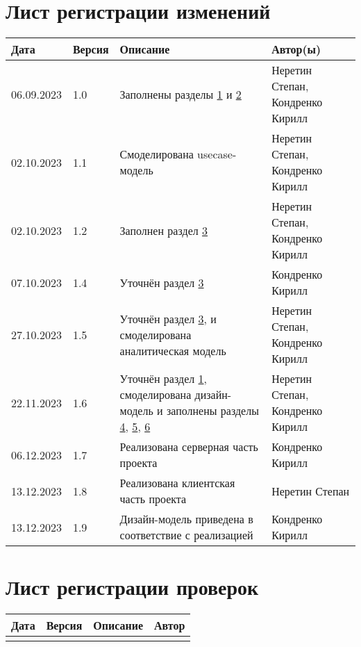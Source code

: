 \chapter*{Лист регистрации изменений}
	\begin{tabularx}{\textwidth}{
			| >{\centering\arraybackslash\hsize=2.5cm}X
			| >{\centering\arraybackslash\hsize=1.5cm}X
			| >{\centering\arraybackslash}X
			| >{\centering\arraybackslash\hsize=5cm}X
			|}
		\hline
		\textbf{Дата} & \textbf{Версия} & \textbf{Описание} & \textbf{Автор(ы)} \\\hline
		
		06.09.2023 & 1.0 & Заполнены разделы \hyperref[chapter1]{1} и \hyperref[chapter2]{2} & Неретин Степан, Кондренко Кирилл \\\hline
				
		02.10.2023 & 1.1 & Смоделирована usecase-модель & Неретин Степан, Кондренко Кирилл \\\hline
		
		02.10.2023 & 1.2 & Заполнен раздел \hyperref[chapter3]{3} & Неретин Степан, Кондренко Кирилл \\\hline
		
		07.10.2023 & 1.4 & Уточнён раздел \hyperref[chapter3]{3} & Кондренко Кирилл \\\hline

		27.10.2023 & 1.5 & Уточнён раздел \hyperref[chapter3]{3}, и смоделирована аналитическая модель & Неретин Степан, Кондренко Кирилл \\\hline
		
		22.11.2023 & 1.6 & Уточнён раздел \hyperref[chapter1]{1}, смоделирована дизайн-модель и заполнены разделы \hyperref[chapter4]{4}, \hyperref[chapter5]{5}, \hyperref[chapter6]{6} & Неретин Степан, Кондренко Кирилл \\\hline
		
		06.12.2023 & 1.7 & Реализована серверная часть проекта & Кондренко Кирилл \\\hline
		
		13.12.2023 & 1.8 & Реализована клиентская часть проекта & Неретин Степан \\\hline
		
		13.12.2023 & 1.9 & Дизайн-модель приведена в соответствие с реализацией & Кондренко Кирилл \\\hline
	\end{tabularx}
\chapter*{Лист регистрации проверок}
	\begin{tabularx}{\textwidth}{
			| >{\centering\arraybackslash\hsize=2cm}X
			| >{\centering\arraybackslash\hsize=1.5cm}X
			| >{\centering\arraybackslash}X
			| >{\centering\arraybackslash\hsize=5cm}X
			|}
		\hline
		\textbf{Дата} & \textbf{Версия} & \textbf{Описание} & \textbf{Автор} \\\hline
		&&& \\\hline
	\end{tabularx}
